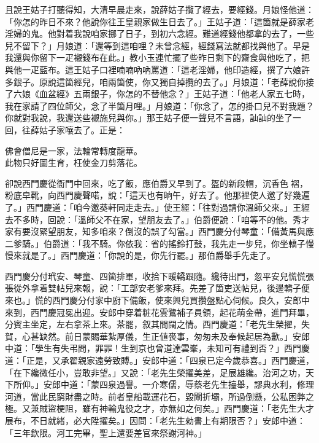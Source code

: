 且說王姑子打聽得知，大清早晨走來，說薛姑子攬了經去，要經錢。月娘怪他道：「你怎的昨日不來？他說你往王皇親家做生日去了。」王姑子道：「這箇就是薛家老淫婦的鬼。他對着我說咱家挪了日子，到初六念經。難道經錢他都拿的去了，一些兒不留下？」月娘道：「還等到這咱哩？未曾念經，經錢寫法就都找與他了。早是我還與你留下一疋襯錢布在此。」教小玉連忙擺了些昨日剩下的齋食與他吃了，把與他一疋藍布。這王姑子口裡喃喃吶吶罵道：「這老淫婦，他印造經，撰了六娘許多銀子。原說這箇經兒，咱兩箇使，你又獨自掉攬的去了。」{}月娘道：「老薛說你接了六娘《血盆經》五兩銀子，你怎的不替他念？」王姑子道：「他老人家五七時，我在家請了四位師父，念了半箇月哩。」月娘道：「你念了，怎的掛口兒不對我題？你就對我說，我還送些襯施兒與你。」那王姑子便一聲兒不言語，訕訕的坐了一回，{}往薛姑子家嚷去了。正是：

\begin{myquote} 
佛會僧尼是一家，法輪常轉度龍華。\\此物只好圖生育，枉使金刀剪落花。
\end{myquote} 

卻說西門慶從衙門中回來，吃了飯，應伯爵又早到了。盔的新段帽，沉香色𧜽褶，粉底皁靴，{}向西門慶聲喏，說：「這天也有晌午，好去了。他那裡使人邀了好幾遍了。」西門慶道：「咱今邀葵軒同走走去。」使王經：「往對過請你溫師父來。」王經去不多時，回說：「溫師父不在家，望朋友去了。」伯爵便說：「咱等不的他。秀才家有要沒緊望朋友，知多咱來？倒沒的誤了勾當。」西門慶分付琴童：「備黃馬與應二爹騎。」伯爵道：「我不騎。你依我：省的搖鈴打鼓，我先走一步兒，你坐轎子慢慢來就是了。」西門慶道：「你說的是，你先行罷。」那伯爵舉手先走了。

西門慶分付玳安、琴童、四箇排軍，收拾下暖轎跟隨。纔待出門，忽平安兒慌慌張張從外拿着雙帖兒來報，說：「工部安老爹來拜。先差了箇吏送帖兒，後邊轎子便來也。」慌的西門慶分付家中廚下備飯，使來興兒買攢盤點心伺候。良久，安郎中來到，西門慶冠冕出迎。安郎中穿着粧花雲鷺補子員領，起花萌金帶，進門拜畢，分賓主坐定，左右拿茶上來。茶罷，叙其間闊之情。西門慶道：「老先生榮擢，失賀，心甚缺然。前日蒙賜華紮厚儀，生正値䘮事，匆匆未及奉候起居為歉。」安郎中道：「學生有失弔問，罪罪！生到京也曾道達雲峯，未知可有禮到否？」西門慶道：「正是，又承翟親家遠勞致賻。」{}安郎中道：「四泉已定今歲恭喜。」西門慶道，「在下纔微任小，豈敢非望。」又說：「老先生榮擢美差，足展雄纔。治河之功，天下所仰。」安郎中道：「蒙四泉過譽。一介寒儒，辱蔡老先生擡舉，謬典水利，修理河道，當此民窮財盡之時。前者皇船載運花石，毀閘折壩，所過倒懸，公私困弊之極。又兼賊盜梗阻，雖有神輸鬼役之才，亦無如之何矣。」西門慶道：「老先生大才展布，不日就緒，必大陞擢矣。」因問：「老先生勑書上有期限否？」安郎中道：「三年欽限。河工完畢，聖上還要差官來祭謝河神。」

